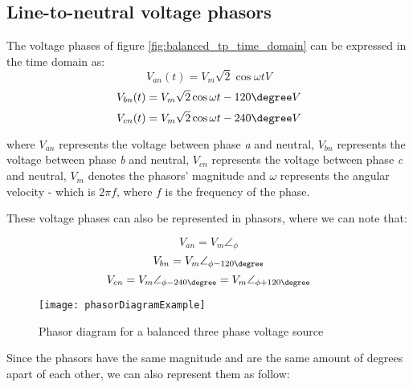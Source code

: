 \subsection{Line-to-neutral voltage phasors}

The voltage phases of figure \ref{fig:balanced_tp_time_domain} can be expressed in the time domain as:
\begin{equation} \label{eq:balanced_tpVan_timedomain}
	V_{an}(t) = V_{m}\sqrt{2}\cos{\omega t} V
\end{equation}
\begin{equation} \label{eq:balanced_tpVbn_timedomain}
	V_{bn}(t) = V_{m}\sqrt{2}\cos{\omega t - 120\degree} V
\end{equation}
\begin{equation} \label{eq:balanced_tpVcn_timedomain}
	V_{cn}(t) = V_{m}\sqrt{2}\cos{\omega t - 240\degree} V
\end{equation}

where $V_{an}$ represents the voltage between phase \emph{a} and neutral, $V_{bn}$ represents the voltage between phase \emph{b} and neutral, $V_{cn}$ represents the voltage between phase \emph{c} and neutral, $V_{m}$ denotes the phasors' magnitude and $\omega$ represents the angular velocity - which is $2\pi f$, where $f$ is the frequency of the phase. 

These voltage phases can also be represented in phasors, where we can note that:

\begin{equation} \label{eq:balanced_tpVan}
	V_{an} = V_{m}\angle_{\phi}
\end{equation}
\begin{equation} \label{eq:balanced_tpVbn}
	V_{bn} = V_{m}\angle_{\phi - 120\degree} 
\end{equation}
\begin{equation} \label{eq:balanced_tpVcn}
	V_{cn} = V_{m}\angle_{\phi - 240\degree} = V_{m}\angle_{\phi + 120\degree} 
\end{equation}

\begin{figure}[htbp]
	\centering
	\texttt{[image: phasorDiagramExample]}
	\caption{Phasor diagram for a balanced three phase voltage source}
	\label{fig:balanced_tp_phasor_domain}
\end{figure}

Since the phasors have the same magnitude and are the same amount of degrees apart of each other, we can also represent them as follow:

